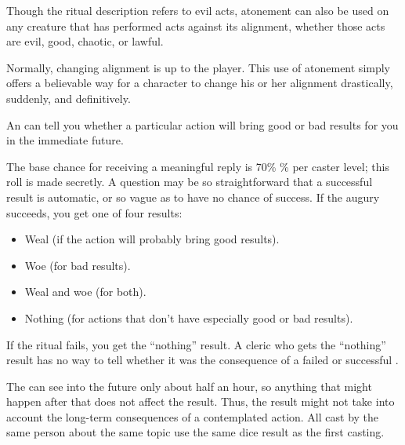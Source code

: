 \par Though the ritual description refers to evil acts, atonement can also be used on any creature that has performed acts against its alignment, whether those acts are evil, good, chaotic, or lawful.
\spellnotes \par {} Normally, changing alignment is up to the player. This use of atonement simply offers a believable way for a character to change his or her alignment drastically, suddenly, and definitively.

\spelleffect An  can tell you whether a particular action will bring good or bad results for you in the immediate future.
\par The base chance for receiving a meaningful reply is 70\% \% per caster level; this roll is made secretly. A question may be so straightforward that a successful result is automatic, or so vague as to have no chance of success. If the augury succeeds, you get one of four results:
\begin{itemize}
    \item Weal (if the action will probably bring good results).
    \item Woe (for bad results).
    \item Weal and woe (for both).
    \item Nothing (for actions that don't have especially good or bad results).
\end{itemize}
\par If the ritual fails, you get the ``nothing'' result. A cleric who gets the ``nothing'' result has no way to tell whether it was the consequence of a failed or successful .
\par The  can see into the future only about half an hour, so anything that might happen after that does not affect the result. Thus, the result might not take into account the long-term consequences of a contemplated action. All  cast by the same person about the same topic use the same dice result as the first casting.

